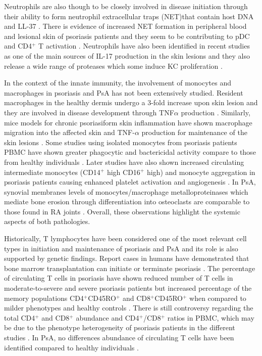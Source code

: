 Neutrophils are also though to be closely involved in disease initiation through their ability to form neutrophil extracellular traps (NET)that contain host DNA and LL-37 \parencite{Hu2016}. There is evidence of increased NET formation in peripheral blood and lesional skin of psoriasis patients and they seem to be contributing to pDC and CD4$^+$ T activation \parencite{Hu2016}. Neutrophils have also been identified in recent studies as one of the main sources of IL-17 production in the skin lesions \parencite{Lin2011} and they also release a wide range of proteases which some induce KC proliferation \parencite{Mahil2006}.

In the context of the innate immunity, the involvement of monocytes and macrophages in psoriasis and PsA has not been extensively studied. Resident macrophages in the healthy dermis undergo a 3-fold increase upon skin lesion and they are involved in disease development through TNF$\alpha$ production \parencite{Perera2012, Mahil2016}. Similarly, mice models for chronic psoriasiform skin inflammation have shown macrophage migration into the affected skin and TNF-$\alpha$ production for maintenance of the skin lesions \parencite{Stratis2006, Wang2006}. Some studies using isolated monocytes from psoriasis patients PBMC  have shown greater phagocytic and bactericidal activity compare to those from healthy individuals \parencite{Bar-Eli1979}. Later studies have also shown increased circulating intermediate monocytes (CD14$^{+}$ high CD16$^{+}$ high) and monocyte aggregation in psoriasis patients causing enhanced platelet activation and angiogenesis \parencite {Golden2015}. In PsA, synovial membranes levels of monocytes/macrophage metalloproteinases which mediate bone erosion through differentiation into osteoclasts are comparable to those found in RA joints \parencite{Hitchon2002}. Overall, these observations highlight the systemic aspects of both pathologies. 

Historically, T lymphocytes have been considered one of the most relevant cell types in initiation and maintenance of psoriasis and PsA and its role is also supported by genetic findings. Report cases in humans have demonstrated that bone marrow transplantation can initiate or terminate psoriasis \parencite{Eedy1990, Gardembas1990}. The percentage of circulating T cells in psoriasis have shown reduced number of T cells in moderate-to-severe and severe psoriasis patients but increased percentage of the memory populations CD4$^{+}$CD45RO$^{+}$ and CD8$^{+}$CD45RO$^{+}$ when compared to milder phenotypes and healthy controls \parencite{Lecewicz-Toruń2001,Langewouters2008}. There is still controversy regarding the total CD4$^+$ and CD8$^{+}$ abundance and CD4$^{+}$/CD8$^{+}$ ratios in PBMC, which may be due to the phenotype heterogeneity of psoriasis patients in the different studies \parencite{Lecewicz-Toruń2001,Cameron2003,Langewouters2008}. In PsA, no differences  abundance of circulating T cells have been identified compared to healthy individuals \parencite{Costello1999}.

